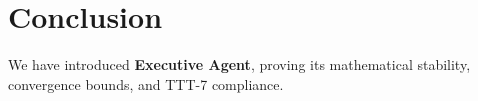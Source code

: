 \section{Conclusion}
We have introduced \textbf{Executive Agent}, proving its mathematical stability, convergence bounds, and TTT-7 compliance.